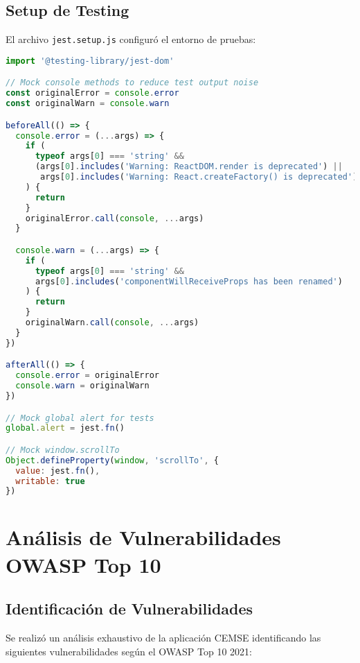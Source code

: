\documentclass[12pt,a4paper]{article}
\begin{document}
\subsection{Setup de Testing}

El archivo \texttt{jest.setup.js} configuró el entorno de pruebas:

\begin{lstlisting}[language=JavaScript, caption=Setup de Jest]
import '@testing-library/jest-dom'

// Mock console methods to reduce test output noise
const originalError = console.error
const originalWarn = console.warn

beforeAll(() => {
  console.error = (...args) => {
    if (
      typeof args[0] === 'string' &&
      (args[0].includes('Warning: ReactDOM.render is deprecated') ||
       args[0].includes('Warning: React.createFactory() is deprecated'))
    ) {
      return
    }
    originalError.call(console, ...args)
  }

  console.warn = (...args) => {
    if (
      typeof args[0] === 'string' &&
      args[0].includes('componentWillReceiveProps has been renamed')
    ) {
      return
    }
    originalWarn.call(console, ...args)
  }
})

afterAll(() => {
  console.error = originalError
  console.warn = originalWarn
})

// Mock global alert for tests
global.alert = jest.fn()

// Mock window.scrollTo
Object.defineProperty(window, 'scrollTo', {
  value: jest.fn(),
  writable: true
})
\end{lstlisting}

\section{Análisis de Vulnerabilidades OWASP Top 10}

\subsection{Identificación de Vulnerabilidades}

Se realizó un análisis exhaustivo de la aplicación CEMSE identificando las siguientes vulnerabilidades según el OWASP Top 10 2021:
\end{document}
